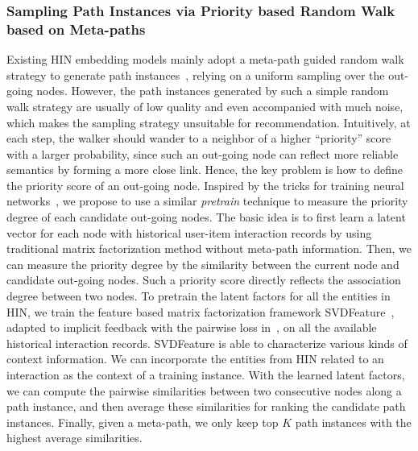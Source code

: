 \subsubsection{Sampling Path Instances via Priority based Random Walk based on Meta-paths}
Existing HIN embedding models mainly adopt a meta-path guided random walk strategy to generate path instances~\cite{dong2017metapath2vec}, relying on a uniform sampling over the out-going nodes.
However, the path instances generated by such a simple random walk strategy are usually of low quality and even accompanied with much noise, which makes the sampling strategy unsuitable for recommendation.
Intuitively, at each step, the walker should  wander to a neighbor of a higher ``priority'' score with a larger probability, since such an out-going node can reflect more reliable semantics by forming a more close link. Hence, the key problem is how to define the priority score of an out-going node.
Inspired by the tricks for training neural networks~\cite{he2017neural,hinton2012better}, we propose to use a similar \emph{pretrain} technique to measure the priority degree of each candidate out-going nodes.  The basic idea is to first learn a latent vector for each node with historical user-item interaction records by using traditional matrix factorization method without meta-path information. Then, we can measure the priority degree by the similarity between the current node and candidate out-going nodes.  Such a priority score directly reflects the association degree between two nodes. To pretrain the latent factors for all the entities in HIN, we train the feature based matrix factorization framework SVDFeature~\cite{chen2012svdfeature}, adapted to implicit feedback with the pairwise loss in~\cite{rendle2009bpr}, on all the available historical interaction records.  SVDFeature is able to characterize various kinds of context information. We can incorporate the entities from HIN related to an interaction as the context of a training instance. With the learned latent factors, we can compute the pairwise similarities between two consecutive nodes along a path instance, and then average these similarities for ranking the candidate path instances. Finally, given a meta-path, we only keep top $K$ path instances with the highest average similarities.

